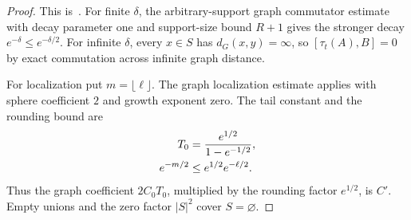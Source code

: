 \begin{proof}
    \leanok
    This is~\cite[``Lieb--Robinson estimates on a one-dimensional graph'']{QICLean2026Blueprint}.
    For finite $\delta$, the arbitrary-support graph commutator estimate
    with decay parameter one and support-size bound $R+1$ gives the
    stronger decay $e^{-\delta}\le e^{-\delta/2}$. For infinite $\delta$,
    every $x\in S$ has $d_G(x,y)=\infty$, so $[\tau_t(A),B]=0$ by
    exact commutation across infinite graph distance.

    For localization put $m=\lfloor\ell\rfloor$. The graph localization
    estimate applies with sphere coefficient $2$ and growth exponent zero.
    The tail constant and the rounding bound are
    \begin{align}
        T_0      & =\frac{e^{1/2}}{1-e^{-1/2}},\notag \\
        e^{-m/2} & \le e^{1/2}e^{-\ell/2}.\notag
    \end{align}
    Thus the graph coefficient $2C_0T_0$, multiplied by the rounding factor
    $e^{1/2}$, is $C'$. Empty unions and the zero factor $|S|^2$ cover
    $S=\varnothing$.
\end{proof}

